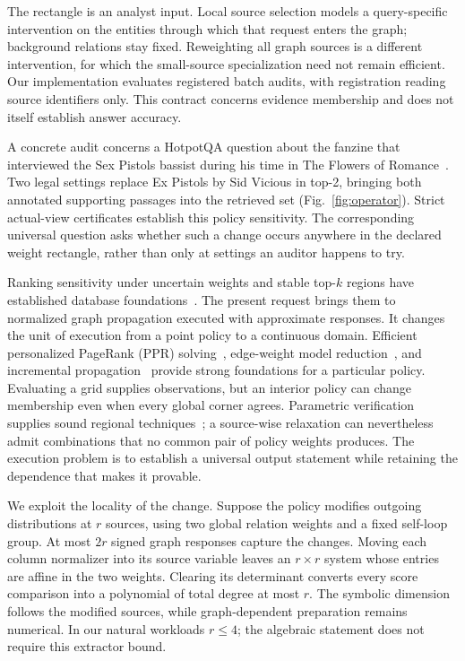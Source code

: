 \documentclass[conference]{IEEEtran}
\begin{document}
The rectangle is an analyst input. Local source selection models a query-specific intervention on the entities through which that request enters the graph; background relations stay fixed. Reweighting all graph sources is a different intervention, for which the small-source specialization need not remain efficient. Our implementation evaluates registered batch audits, with registration reading source identifiers only. This contract concerns evidence membership and does not itself establish answer accuracy.

A concrete audit concerns a HotpotQA question about the fanzine that interviewed the Sex Pistols bassist during his time in The Flowers of Romance~\cite{hotpot}. Two legal settings replace Ex Pistols by Sid Vicious in top-2, bringing both annotated supporting passages into the retrieved set (Fig.~\ref{fig:operator}). Strict actual-view certificates establish this policy sensitivity. The corresponding universal question asks whether such a change occurs anywhere in the declared weight rectangle, rather than only at settings an auditor happens to try.

Ranking sensitivity under uncertain weights and stable top-$k$ regions have established database foundations~\cite{uncertainranking,stablerankings}. The present request brings them to normalized graph propagation executed with approximate responses. It changes the unit of execution from a point policy to a continuous domain. Efficient personalized PageRank (PPR) solving~\cite{maehara}, edge-weight model reduction~\cite{edgeppr}, and incremental propagation~\cite{osp,eveppr} provide strong foundations for a particular policy. Evaluating a grid supplies observations, but an interior policy can change membership even when every global corner agrees. Parametric verification supplies sound regional techniques~\cite{parametric,lifting,sapo}; a source-wise relaxation can nevertheless admit combinations that no common pair of policy weights produces. The execution problem is to establish a universal output statement while retaining the dependence that makes it provable.

We exploit the locality of the change. Suppose the policy modifies outgoing distributions at $r$ sources, using two global relation weights and a fixed self-loop group. At most $2r$ signed graph responses capture the changes. Moving each column normalizer into its source variable leaves an $r\times r$ system whose entries are affine in the two weights. Clearing its determinant converts every score comparison into a polynomial of total degree at most $r$. The symbolic dimension follows the modified sources, while graph-dependent preparation remains numerical. In our natural workloads $r\leq4$; the algebraic statement does not require this extractor bound.
\end{document}
